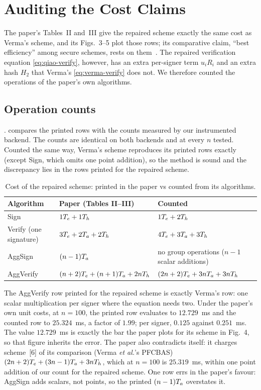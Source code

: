 \section{Auditing the Cost Claims}\label{sec:cost}

The paper's Tables~II and~III give the repaired scheme exactly the same cost as Verma's scheme, and
its Figs.~3--5 plot those rows; its comparative claim, ``best efficiency'' among secure schemes, rests on
them~\cite{qiao2023}. The repaired verification equation \eqref{eq:qiao-verify}, however, has an extra
per-signer term $u_iR_i$ and an extra hash $H_2$ that Verma's \eqref{eq:verma-verify} does not. We
therefore counted the operations of the paper's own algorithms.

\subsection{Operation counts}\label{sec:cost-counts}
.  compares the printed rows with the counts measured by our instrumented
backend. The counts are identical on both backends and at every $n$ tested. Counted the same way, Verma's
scheme reproduces its printed rows exactly (except \textsf{Sign}, which omits one point addition), so the
method is sound and the discrepancy lies in the rows printed for the repaired scheme.

\begin{table}[ht]
\centering\small
\caption{Cost of the repaired scheme: printed in the paper vs counted from its algorithms.}\label{tab:counts}
\begin{tabular}{lll}
\toprule
Algorithm & Paper (Tables II--III) & Counted \\
\midrule
\textsf{Sign} & $1T_{e}+1T_{h}$ & $1T_{e}+2T_{h}$ \\
\textsf{Verify} (one signature) & $3T_{e}+2T_{a}+2T_{h}$ & $4T_{e}+3T_{a}+3T_{h}$ \\
\textsf{AggSign} & $(n-1)T_{a}$ & no group operations ($n-1$ scalar additions) \\
\textsf{AggVerify} & $(n+2)T_{e}+(n+1)T_{a}+2nT_{h}$ & $(2n+2)T_{e}+3nT_{a}+3nT_{h}$ \\
\bottomrule
\end{tabular}
\end{table}

The \textsf{AggVerify} row printed for the repaired scheme is exactly Verma's row: one scalar
multiplication per signer where the equation needs two. Under the paper's own unit costs, at $n=100$, the
printed row evaluates to $12.729$~ms and the counted row to $25.324$~ms, a factor of $1.99$;
per signer, $0.125$ against $0.251$~ms. The value $12.729$~ms is exactly the bar the
paper plots for its scheme in Fig.~4, so that figure inherits the error. The paper also contradicts
itself: it charges scheme~[6] of its comparison (Verma \emph{et al.}'s PFCBAS) $(2n+2)T_{e}+(3n-1)T_{a}+3nT_{h}$,
which at $n=100$ is $25.319$~ms, within one point addition of our count for the repaired scheme. One
row errs in the paper's favour: \textsf{AggSign} adds scalars, not points, so the printed $(n-1)T_{a}$
overstates it.


